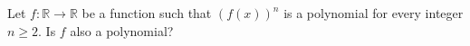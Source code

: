 Let $f: \mathbb{R}\to\mathbb{R}$ be a function such that  $(f(x))^{n}$ is a polynomial for every integer $n\geq 2$. Is $f$ also a polynomial?